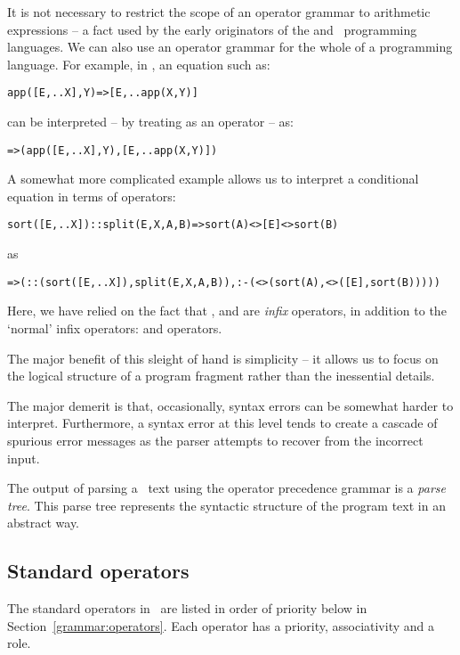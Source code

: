 It is not necessary to restrict the scope of an operator grammar to arithmetic expressions -- a fact used by the early originators of the  and \prolog\ programming languages. We can also use an operator grammar for the whole of a programming language. For example, in \go, an equation such as:
\begin{alltt}
app([E,..X],Y) => [E,..app(X,Y)]
\end{alltt}
can be interpreted -- by treating \function{=>} as an operator -- as:
\begin{alltt}
=>(app([E,..X],Y),[E,..app(X,Y)])
\end{alltt}
A somewhat more complicated example allows us to interpret a conditional equation in terms of operators:
\begin{alltt}
sort([E,..X])::split(E,X,A,B) => sort(A)<>[E]<>sort(B) 
\end{alltt}
as
\begin{alltt}
=>(::(sort([E,..X]),split(E,X,A,B)),:-(<>(sort(A),<>([E],sort(B)))))

\end{alltt}
Here, we have relied on the fact that \function{=>}, \function{<>} and \function{::} are {\em infix} operators, in addition to the `normal' infix operators: \function{+} and \function{-} operators. 

\begin{aside}
The major benefit of this sleight of hand is simplicity -- it allows us to focus on the logical structure of a program fragment rather than the inessential details.

The major demerit is that, occasionally, syntax errors can be somewhat harder to interpret. Furthermore, a syntax error at this level tends to create a cascade of spurious error messages as the parser attempts to recover from the incorrect input.
\end{aside}

The output of parsing a \go\ text using the operator precedence grammar is a \emph{parse tree}. This parse tree represents the syntactic structure of the program text in an abstract way.


\subsection{Standard operators}   
The standard operators in \go\ are listed in order of priority below in Section~\ref{grammar:operators}. Each operator has a priority, associativity and a role.

